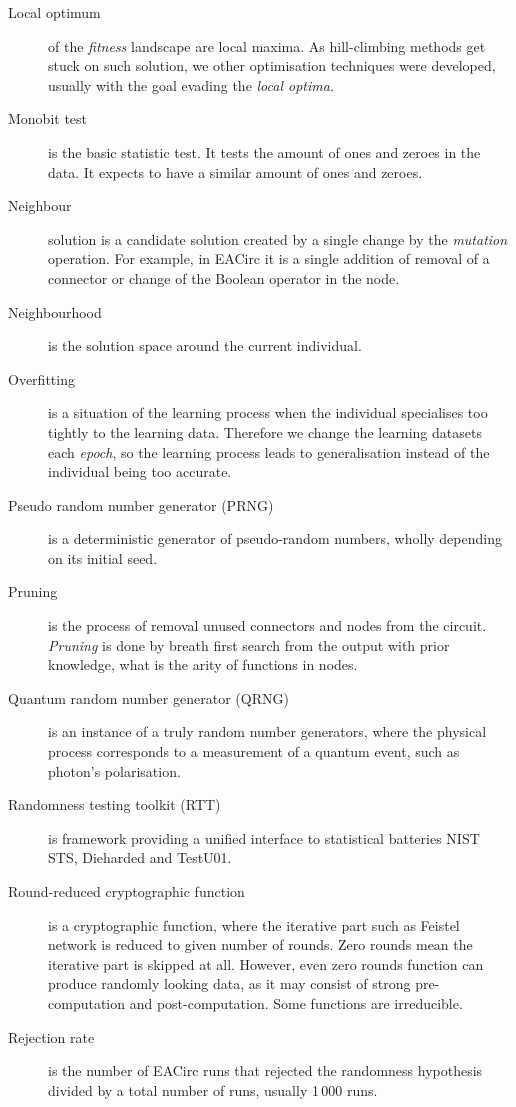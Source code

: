 \documentclass[
    digital,    %
    oneside,    %
    color,
    11pt,
    nocover,
    notable,
    nolof,
    nolot,
]{fithesis3}
\begin{document}
\begin{description}
\item[Local optimum] of the \textit{fitness} landscape are local maxima. As hill-climbing methods get stuck on such solution, we other optimisation techniques were developed, usually with the goal evading the \textit{local optima}.
\item[Monobit test] is the basic statistic test. It tests the amount of ones and zeroes in the data. It expects to have a similar amount of ones and zeroes.
\item[Neighbour] solution is a candidate solution created by a single change by the \textit{mutation} operation. For example, in EACirc it is a single addition of removal of a connector or change of the Boolean operator in the node.
\item[Neighbourhood] is the solution space around the current individual.
\item[Overfitting] is a situation of the learning process when the individual specialises too tightly to the learning data. Therefore we change the learning datasets each \textit{epoch}, so the learning process leads to generalisation instead of the individual being too accurate.
\item[Pseudo random number generator (PRNG)] is a deterministic generator of pseudo-random numbers, wholly depending on its initial seed.
\item[Pruning] is the process of removal unused connectors and nodes from the circuit. \textit{Pruning} is done by breath first search from the output with prior knowledge, what is the arity of functions in nodes.
\item[Quantum random number generator (QRNG)] is an instance of a truly random number generators, where the physical process corresponds to a measurement of a quantum event, such as photon's polarisation.
\item[Randomness testing toolkit (RTT)] is framework providing a unified interface to statistical batteries NIST STS, Dieharded and TestU01.
\item[Round-reduced cryptographic function] is a cryptographic function, where the iterative part such as Feistel network is reduced to given number of rounds. Zero rounds mean the iterative part is skipped at all. However, even zero rounds function can produce randomly looking data, as it may consist of strong pre-computation and post-computation. Some functions are irreducible.
\item[Rejection rate] is the number of EACirc runs that rejected the randomness hypothesis divided by a total number of runs, usually 1\,000 runs.

\end{description}
\end{document}
